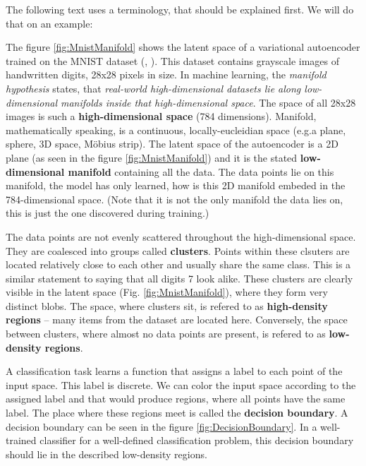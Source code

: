 \qquad

The following text uses a terminology, that should be explained first. We will do that on an example:

The figure \ref{fig:MnistManifold} shows the latent space of a variational autoencoder trained on the MNIST dataset (\cite{VariationalAutoencoder}, \cite{Mnist}). This dataset contains grayscale images of handwritten digits, 28x28 pixels in size. In machine learning, the \emph{manifold hypothesis} states, that \emph{real-world high-dimensional datasets lie along low-dimensional manifolds inside that high-dimensional space}. The space of all 28x28 images is such a \textbf{high-dimensional space} (784 dimensions). Manifold, mathematically speaking, is a continuous, locally-eucleidian space (e.g.\@ a plane, sphere, 3D space, Möbius strip). The latent space of the autoencoder is a 2D plane (as seen in the figure \ref{fig:MnistManifold}) and it is the stated \textbf{low-dimensional manifold} containing all the data. The data points lie on this manifold, the model has only learned, how is this 2D manifold embeded in the 784-dimensional space. (Note that it is not the only manifold the data lies on, this is just the one discovered during training.)

The data points are not evenly scattered throughout the high-dimensional space. They are coalesced into groups called \textbf{clusters}. Points within these clsuters are located relatively close to each other and usually share the same class. This is a similar statement to saying that all digits 7 look alike. These clusters are clearly visible in the latent space (Fig. \ref{fig:MnistManifold}), where they form very distinct blobs. The space, where clusters sit, is refered to as \textbf{high-density regions} -- many items from the dataset are located here. Conversely, the space between clusters, where almost no data points are present, is refered to as \textbf{low-density regions}.

A classification task learns a function that assigns a label to each point of the input space. This label is discrete. We can color the input space according to the assigned label and that would produce regions, where all points have the same label. The place where these regions meet is called the \textbf{decision boundary}. A decision boundary can be seen in the figure \ref{fig:DecisionBoundary}. In a well-trained classifier for a well-defined classification problem, this decision boundary should lie in the described low-density regions.


